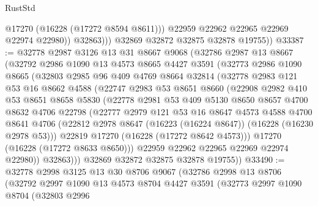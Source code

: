 \begin{lexlean}{RustStd}
\begin{coremodule}
                    @17270
                    (@16228 (@17272 @8594 @8611)))
                  @22959
                  @22962
                  @22965
                  @22969
                  @22974
                  @22980))
              @32863)))
        @32869
        @32872
        @32875
        @32878
        @19755))
@33387 := @32778
    @2987
    @3126
    @13
    @31
    @8667
    @9068
    (@32786
      @2987
      @13
      @8667
      (@32792
        @2986
        @1090
        @13
        @4573
        @8665
        @4427
        @3591
        (@32773
          @2986
          @1090
          @8665
          (@32803
            @2985
            @96
            @409
            @4769
            @8664
            @32814
            (@32778
              @2983
              @121
              @53
              @16
              @8662
              @4588
              (@22747
                @2983
                @53
                @8651
                @8660
                (@22908
                  @2982
                  @410
                  @53
                  @8651
                  @8658
                  @5830
                  (@22778
                    @2981
                    @53
                    @409
                    @5130
                    @8650
                    @8657
                    @4700
                    @8632
                    @4706
                    @22798
                    (@22777
                      @2979
                      @121
                      @53
                      @16
                      @8647
                      @4573
                      @4588
                      @4700
                      @8641
                      @4706
                      (@22812 @2978 @8647 (@16223 (@16224 @8647)) (@16228 (@16230 @2978 @53)))
                      @22819
                      @17270
                      (@16228 (@17272 @8642 @4573)))
                    @17270
                    (@16228 (@17272 @8633 @8650)))
                  @22959
                  @22962
                  @22965
                  @22969
                  @22974
                  @22980))
              @32863)))
        @32869
        @32872
        @32875
        @32878
        @19755))
@33490 := @32778
    @2998
    @3125
    @13
    @30
    @8706
    @9067
    (@32786
      @2998
      @13
      @8706
      (@32792
        @2997
        @1090
        @13
        @4573
        @8704
        @4427
        @3591
        (@32773
          @2997
          @1090
          @8704
          (@32803
            @2996

\end{coremodule}
\end{lexlean}
